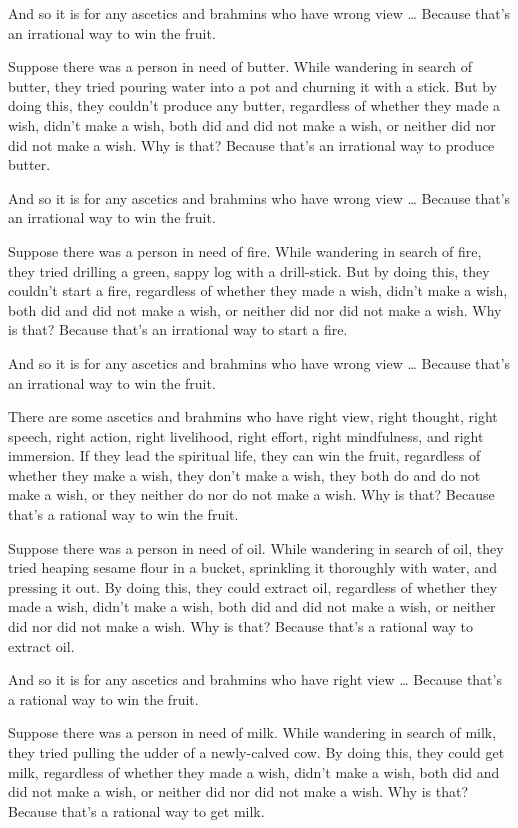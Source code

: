 \documentclass[12pt,openany]{book}%
\begin{document}
And so it is for any ascetics and brahmins who have wrong view … Because that’s an irrational way to win the fruit. 

Suppose there was a person in need of butter. While wandering in search of butter, they tried pouring water into a pot and churning it with a stick. But by doing this, they couldn’t produce any butter, regardless of whether they made a wish, didn’t make a wish, both did and did not make a wish, or neither did nor did not make a wish. Why is that? Because that’s an irrational way to produce butter. 

And so it is for any ascetics and brahmins who have wrong view … Because that’s an irrational way to win the fruit. 

Suppose there was a person in need of fire. While wandering in search of fire, they tried drilling a green, sappy log with a drill-stick. But by doing this, they couldn’t start a fire, regardless of whether they made a wish, didn’t make a wish, both did and did not make a wish, or neither did nor did not make a wish. Why is that? Because that’s an irrational way to start a fire. 

And so it is for any ascetics and brahmins who have wrong view … Because that’s an irrational way to win the fruit. 

There are some ascetics and brahmins who have right view, right thought, right speech, right action, right livelihood, right effort, right mindfulness, and right immersion. If they lead the spiritual life, they can win the fruit, regardless of whether they make a wish, they don’t make a wish, they both do and do not make a wish, or they neither do nor do not make a wish. Why is that? Because that’s a rational way to win the fruit. 

Suppose there was a person in need of oil. While wandering in search of oil, they tried heaping sesame flour in a bucket, sprinkling it thoroughly with water, and pressing it out. By doing this, they could extract oil, regardless of whether they made a wish, didn’t make a wish, both did and did not make a wish, or neither did nor did not make a wish. Why is that? Because that’s a rational way to extract oil. 

And so it is for any ascetics and brahmins who have right view … Because that’s a rational way to win the fruit. 

Suppose there was a person in need of milk. While wandering in search of milk, they tried pulling the udder of a newly-calved cow. By doing this, they could get milk, regardless of whether they made a wish, didn’t make a wish, both did and did not make a wish, or neither did nor did not make a wish. Why is that? Because that’s a rational way to get milk. 
\end{document}
